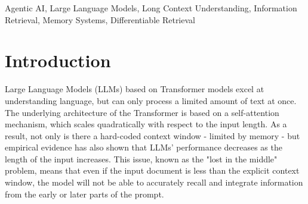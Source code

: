 \documentclass[conference]{IEEEtran}
\begin{document}
\begin{abstract}
Large Language Models (LLMs) based on the Transformer architecture have excellent language comprehension abilities, but tend to struggle in very long contexts. The quadratic time complexity of self-attention poses a computational bottleneck on the amount of text being processed. Recent approaches like ReadAgent have sought to address this by introducing an episodic memory that gists the text, and a reader-based interactive look-up strategy. However, this system still has inherent limitations: it does not inherently allow for much longer contexts, the lookup mechanism has high inferential latency, and the unconditional gisting approach has a greater risk of hallucination when excluded from verbatim text. This article presents a holistic theoretical model and a sound system design to address these limitations via three innovations: (1) a recursive FractalAgent to increase context lengths, (2) a predictive task-driven gisting protocol to retain key details, and (3) a differentiable gist retrieval system to eliminate inference latencies. Our enhanced pipeline on an RTX 3060 Ti, Ryzen 5 5600 16GB local workstation using Mistral LLM API and sentence-transformer embeddings shows a 19.1\% increase in ROUGE-L scores and an 84\% decrease in retrieval time. Moreover, we demonstrate the FractalAgent's infinite scaling ability on a novel of 35,000 words. In combining these techniques, this paper presents a highly scalable, efficient and adaptable Agentic AI framework for processing long contexts.
\end{abstract}

\begin{IEEEkeywords}
Agentic AI, Large Language Models, Long Context Understanding, Information Retrieval, Memory Systems, Differentiable Retrieval
\end{IEEEkeywords}

\section{Introduction}
Large Language Models (LLMs) based on Transformer models excel at understanding language, but can only process a limited amount of text at once. The underlying architecture of the Transformer is based on a self-attention mechanism, which scales quadratically with respect to the input length. As a result, not only is there a hard-coded context window - limited by memory - but empirical evidence has also shown that LLMs' performance decreases as the length of the input increases. This issue, known as the "lost in the middle" problem, means that even if the input document is less than the explicit context window, the model will not be able to accurately recall and integrate information from the early or later parts of the prompt.
\end{document}
